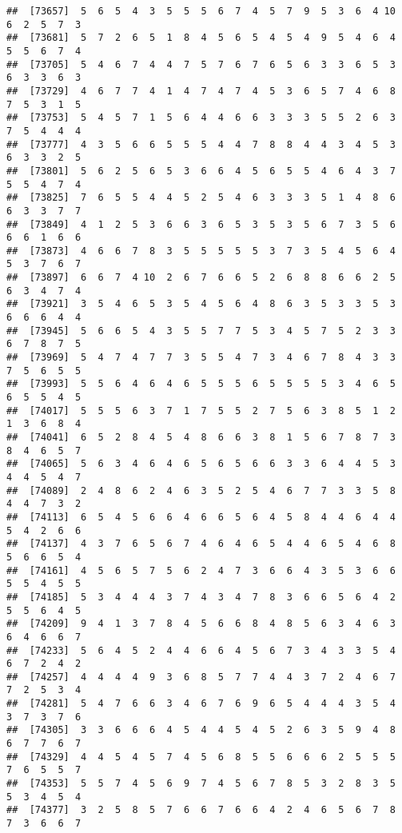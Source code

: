 \documentclass[
]{book}
\begin{document}
\begin{verbatim}
##  [73657]  5  6  5  4  3  5  5  5  6  7  4  5  7  9  5  3  6  4 10  6  2  5  7  3
##  [73681]  5  7  2  6  5  1  8  4  5  6  5  4  5  4  9  5  4  6  4  5  5  6  7  4
##  [73705]  5  4  6  7  4  4  7  5  7  6  7  6  5  6  3  3  6  5  3  6  3  3  6  3
##  [73729]  4  6  7  7  4  1  4  7  4  7  4  5  3  6  5  7  4  6  8  7  5  3  1  5
##  [73753]  5  4  5  7  1  5  6  4  4  6  6  3  3  3  5  5  2  6  3  7  5  4  4  4
##  [73777]  4  3  5  6  6  5  5  5  4  4  7  8  8  4  4  3  4  5  3  6  3  3  2  5
##  [73801]  5  6  2  5  6  5  3  6  6  4  5  6  5  5  4  6  4  3  7  5  5  4  7  4
##  [73825]  7  6  5  5  4  4  5  2  5  4  6  3  3  3  5  1  4  8  6  6  3  3  7  7
##  [73849]  4  1  2  5  3  6  6  3  6  5  3  5  3  5  6  7  3  5  6  6  6  1  6  6
##  [73873]  4  6  6  7  8  3  5  5  5  5  5  3  7  3  5  4  5  6  4  5  3  7  6  7
##  [73897]  6  6  7  4 10  2  6  7  6  6  5  2  6  8  8  6  6  2  5  6  3  4  7  4
##  [73921]  3  5  4  6  5  3  5  4  5  6  4  8  6  3  5  3  3  5  3  6  6  6  4  4
##  [73945]  5  6  6  5  4  3  5  5  7  7  5  3  4  5  7  5  2  3  3  6  7  8  7  5
##  [73969]  5  4  7  4  7  7  3  5  5  4  7  3  4  6  7  8  4  3  3  7  5  6  5  5
##  [73993]  5  5  6  4  6  4  6  5  5  5  6  5  5  5  5  3  4  6  5  6  5  5  4  5
##  [74017]  5  5  5  6  3  7  1  7  5  5  2  7  5  6  3  8  5  1  2  1  3  6  8  4
##  [74041]  6  5  2  8  4  5  4  8  6  6  3  8  1  5  6  7  8  7  3  8  4  6  5  7
##  [74065]  5  6  3  4  6  4  6  5  6  5  6  6  3  3  6  4  4  5  3  4  4  5  4  7
##  [74089]  2  4  8  6  2  4  6  3  5  2  5  4  6  7  7  3  3  5  8  4  4  7  3  2
##  [74113]  6  5  4  5  6  6  4  6  6  5  6  4  5  8  4  4  6  4  4  5  4  2  6  6
##  [74137]  4  3  7  6  5  6  7  4  6  4  6  5  4  4  6  5  4  6  8  5  6  6  5  4
##  [74161]  4  5  6  5  7  5  6  2  4  7  3  6  6  4  3  5  3  6  6  5  5  4  5  5
##  [74185]  5  3  4  4  4  3  7  4  3  4  7  8  3  6  6  5  6  4  2  5  5  6  4  5
##  [74209]  9  4  1  3  7  8  4  5  6  6  8  4  8  5  6  3  4  6  3  6  4  6  6  7
##  [74233]  5  6  4  5  2  4  4  6  6  4  5  6  7  3  4  3  3  5  4  6  7  2  4  2
##  [74257]  4  4  4  4  9  3  6  8  5  7  7  4  4  3  7  2  4  6  7  7  2  5  3  4
##  [74281]  5  4  7  6  6  3  4  6  7  6  9  6  5  4  4  4  3  5  4  3  7  3  7  6
##  [74305]  3  3  6  6  6  4  5  4  4  5  4  5  2  6  3  5  9  4  8  6  7  7  6  7
##  [74329]  4  4  5  4  5  7  4  5  6  8  5  5  6  6  6  2  5  5  5  7  6  5  5  7
##  [74353]  5  5  7  4  5  6  9  7  4  5  6  7  8  5  3  2  8  3  5  5  3  4  5  4
##  [74377]  3  2  5  8  5  7  6  6  7  6  6  4  2  4  6  5  6  7  8  7  3  6  6  7

\end{verbatim}
\end{document}
